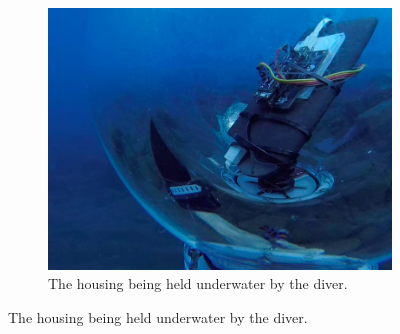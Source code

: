 \begin{figure}[!h]
    \centering
    \begin{subfigure}{0.7\textwidth}
        \centering
        \includegraphics[width=1\textwidth]{figures/underwater_5.jpg}
        \caption{ The housing being held underwater by the diver.  }
        \label{fig:underwater}
    \end{subfigure}


\end{figure}

